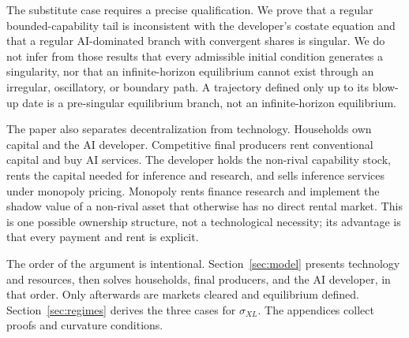 The substitute case requires a precise qualification. We prove that a regular bounded-capability tail is inconsistent with the developer's costate equation and that a regular AI-dominated branch with convergent shares is singular. We do not infer from those results that every admissible initial condition generates a singularity, nor that an infinite-horizon equilibrium cannot exist through an irregular, oscillatory, or boundary path. A trajectory defined only up to its blow-up date is a pre-singular equilibrium branch, not an infinite-horizon equilibrium.

The paper also separates decentralization from technology. Households own capital and the AI developer. Competitive final producers rent conventional capital and buy AI services. The developer holds the non-rival capability stock, rents the capital needed for inference and research, and sells inference services under monopoly pricing. Monopoly rents finance research and implement the shadow value of a non-rival asset that otherwise has no direct rental market. This is one possible ownership structure, not a technological necessity; its advantage is that every payment and rent is explicit.

The order of the argument is intentional. Section~\ref{sec:model} presents technology and resources, then solves households, final producers, and the AI developer, in that order. Only afterwards are markets cleared and equilibrium defined. Section~\ref{sec:regimes} derives the three cases for $\sigma_{XL}$. The appendices collect proofs and curvature conditions.
